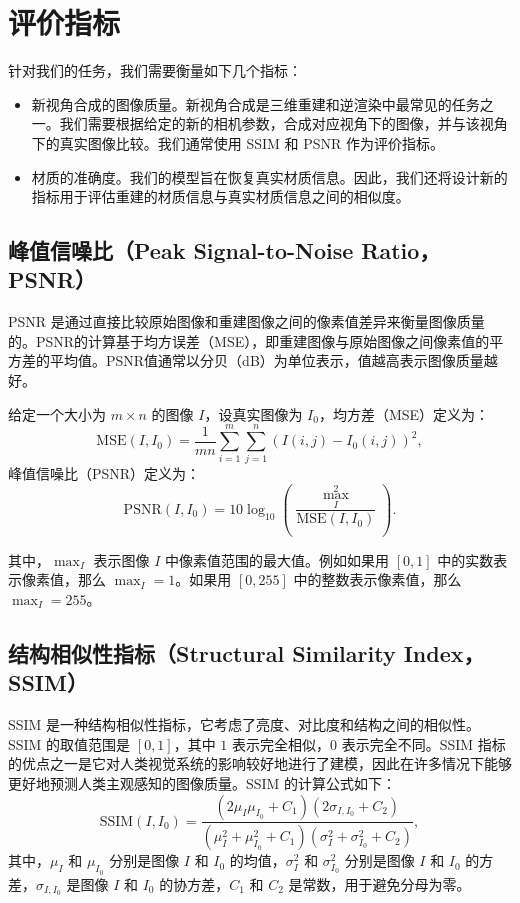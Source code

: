 \section{评价指标}

针对我们的任务，我们需要衡量如下几个指标：

\begin{itemize}
  \item 新视角合成的图像质量。新视角合成是三维重建和逆渲染中最常见的任务之一。我们需要根据给定的新的相机参数，合成对应视角下的图像，并与该视角下的真实图像比较。我们通常使用 SSIM 和 PSNR 作为评价指标。
  \item 材质的准确度。我们的模型旨在恢复真实材质信息。因此，我们还将设计新的指标用于评估重建的材质信息与真实材质信息之间的相似度。
\end{itemize}

\subsection{峰值信噪比（Peak Signal-to-Noise Ratio，PSNR）}

PSNR 是通过直接比较原始图像和重建图像之间的像素值差异来衡量图像质量的。PSNR的计算基于均方误差（MSE），即重建图像与原始图像之间像素值的平方差的平均值。PSNR值通常以分贝（dB）为单位表示，值越高表示图像质量越好。

给定一个大小为 $m \times n$ 的图像 $I$，设真实图像为 $I_0$，均方差（MSE）定义为：
\begin{equation}
  \text{MSE}(I, I_0) = \frac{1}{mn} \sum_{i=1}^m \sum_{j=1}^n (I(i, j) - I_0(i, j))^2,
\end{equation}
峰值信噪比（PSNR）定义为：
\begin{equation}
  \text{PSNR}(I, I_0) = 10 \log_{10} \left( \frac{\max^2_I}{\text{MSE}(I, I_0)} \right).
\end{equation}

其中，$\max_I$ 表示图像 $I$ 中像素值范围的最大值。例如如果用 $[0,1]$ 中的实数表示像素值，那么 $\max_I = 1$。如果用 $[0,255]$ 中的整数表示像素值，那么 $\max_I = 255$。

\subsection{结构相似性指标（Structural Similarity Index，SSIM）}

SSIM 是一种结构相似性指标，它考虑了亮度、对比度和结构之间的相似性。SSIM 的取值范围是 $[0,1]$，其中 $1$ 表示完全相似，$0$ 表示完全不同。SSIM 指标的优点之一是它对人类视觉系统的影响较好地进行了建模，因此在许多情况下能够更好地预测人类主观感知的图像质量。SSIM 的计算公式如下：
\begin{equation}
  \text{SSIM}(I, I_0) = \frac{(2\mu_I\mu_{I_0} + C_1)(2\sigma_{I,I_0} + C_2)}{(\mu_I^2 + \mu_{I_0}^2 + C_1)(\sigma_I^2 + \sigma_{I_0}^2 + C_2)},
\end{equation}
其中，$\mu_I$ 和 $\mu_{I_0}$ 分别是图像 $I$ 和 $I_0$ 的均值，$\sigma_I^2$ 和 $\sigma_{I_0}^2$ 分别是图像 $I$ 和 $I_0$ 的方差，$\sigma_{I,I_0}$ 是图像 $I$ 和 $I_0$ 的协方差，$C_1$ 和 $C_2$ 是常数，用于避免分母为零。

